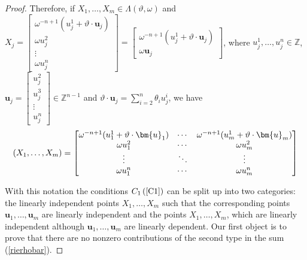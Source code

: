 \documentclass[11pt]{article}
\theoremstyle{definition}
\theoremstyle{proof}
\begin{document}
\begin{proof}
    Therefore, if $X_1, \ldots , X_m \in \Lambda (\vartheta , \omega )$ and $X_j = 
    \begin{bmatrix}
        \omega ^{-n+1} (u_j^1 + \vartheta \cdot \bm{u}_j) \\
        \omega u_j^2 \\
        \vdots \\
        \omega u_j^n
    \end{bmatrix} = 
    \begin{bmatrix}
        \omega ^{-n+1} (u_j^1 + \vartheta \cdot \bm{u}_j) \\
        \omega \bm{u}_j 
    \end{bmatrix}
    $, where $u_j^1, \ldots , u_j^n \in \mathbb{Z}$, $\bm{u}_j =
    \begin{bmatrix}
        u_j^2 \\
        u_j^3 \\
        \vdots \\
        u_j^n
    \end{bmatrix}
    \in \mathbb{Z}^{n-1}$ and $\vartheta \cdot \bm{u}_j = \displaystyle\sum_{i=2}^{n} \theta _i u_j^i$, we have
    \begin{equation}\label{xs}
        (X_1, \ldots, X_m) = 
        \renewcommand\arraystretch{1}
        \begin{bmatrix}
            \omega ^{-n+1}(u^1_1 + \vartheta \cdot \bm{u}_1) & \cdots  & \omega ^{-n+1} ( u^1_m+ \vartheta \cdot \bm{u}_m) \\
            \omega u^2_1                                            & \cdots  & \omega u^2_m \\
            \vdots                                                  & \ddots  & \vdots \\
            \omega u^n_1                                            & \cdots  & \omega u^n_m
        \end{bmatrix}
    \end{equation}

    With this notation the conditions $C_1 \, (\ref{C1})$ can be split up into two categories: the linearly independent points $X_1, \ldots , X_m$ such that the corresponding points $\bm{u}_1, \ldots, \bm{u}_m$ are linearly independent and the points $X_1, \ldots, X_m$, which are linearly independent although $\bm{u}_1, \ldots, \bm{u}_m$ are linearly dependent.
    Our first object is to prove that there are  no nonzero contributions of the second type in the sum (\ref{rierhobar}).


\end{proof}
\end{document}
